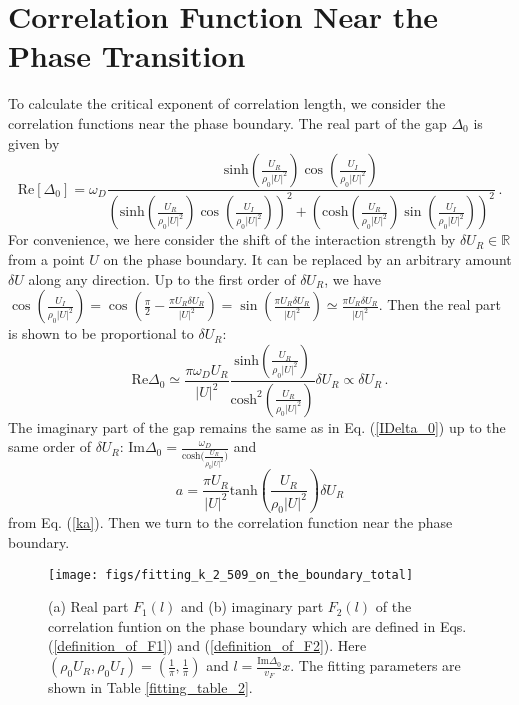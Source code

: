 \documentclass[aps,onecolumn,nofootinbib,superscriptaddress,notitlepage,longbibliography]{revtex4-1}
\begin{document}
\section{Correlation Function Near the Phase Transition}

To calculate the critical exponent of correlation length, we consider the correlation functions near the phase boundary.  The real part of the gap $\Delta_0$ is given by
\begin{equation}
  \text{Re} [\Delta_0] = \omega_D \frac{\text{sinh} \left( \frac{U_R}{\rho_0 |
  U |^2} \right) \cos \left( \frac{U_I}{ \rho_0 | U |^2}
  \right)}{\left( \text{sinh} \left( \frac{U_R}{\rho_0 | U |^2} \right)
  \cos \left( \frac{U_I}{ \rho_0 | U |^2} \right) \right)^2 + \left(
  \text{cosh} \left( \frac{U_R}{\rho_0 | U |^2} \right) \sin \left(
  \frac{U_I}{ \rho_0 | U |^2} \right) \right)^2}\,.\label{Real_gap}
\end{equation}
For convenience, we here consider the shift of the interaction strength by $\delta U_R\in\mathbb{R}$ from a point $U$ on the phase boundary. It can be replaced by an arbitrary amount $\delta U$ along any direction. Up to the first order of $\delta U_R$, we have $\cos \left(
\frac{U_I}{ \rho_0 | U |^2} \right) = \cos \left( \frac{\pi}{2}-\frac{\pi U_R\delta U_R}{|U|^2} \right)=\sin \left(\frac{\pi U_R\delta U_R}{|U|^2} \right) \simeq \frac{\pi U_R\delta U_R}{|U|^2}$. Then the real part is shown to be proportional to $\delta U_R$:
\begin{equation}
  \text{Re} \Delta_0 \simeq \frac{\pi\omega_D U_R}{| U |^2} \frac{\text{sinh}
  \left( \frac{U_R}{\rho_0 | U |^2} \right)}{\text{cosh}^2 \left(
  \frac{U_R}{\rho_0 | U |^2} \right)} \delta U_R \propto \delta U_R\,.
  \label{define_UR_deviation}
\end{equation}
The imaginary part of the gap remains the same as in Eq. (\ref{IDelta_0}) up to the same order of $\delta U_R$: $\text{Im} \Delta_0 =
\frac{\omega_D}{\text{cosh($\frac{U_R}{\rho_0 | U |^2}$)}}$ and   
\begin{equation}
 a=\frac{\pi U_R}{|U|^2}\text{tanh}(\frac{U_R}{\rho_0|U|^2})\delta U_R
 \label{detailed_expression_a}
\end{equation}
from Eq. (\ref{ka}). Then we turn to the correlation function near the phase boundary.

\begin{figure}
	\centering \texttt{[image: figs/fitting\_k\_2\_509\_on\_the\_boundary\_total]}
	\caption{(a) Real part $F_1(l)$ and (b) imaginary part $F_2(l)$ of the correlation funtion on the phase boundary which are defined in Eqs. (\ref{definition_of_F1}) and (\ref{definition_of_F2}). Here $(\rho_{0}U_{R},\rho_{0}U_{I})=(\frac{1}{\pi},\frac{1}{\pi})$ and $l=\frac{\text{Im}\Delta_0}{v_F}x$. The fitting parameters are shown in Table \ref{fitting_table_2}.}
	\label{fig2}
\end{figure}
\end{document}
